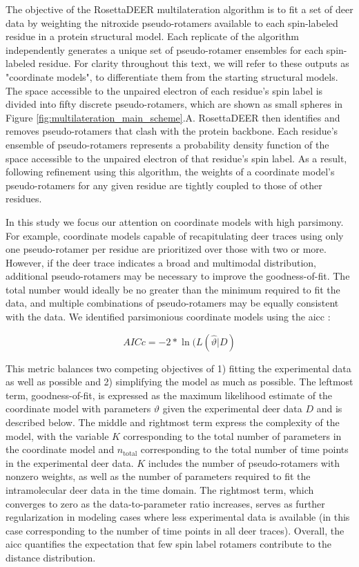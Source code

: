 The objective of the RosettaDEER multilateration algorithm is to fit a set of \gls{deer} data by weighting the nitroxide pseudo-rotamers available to each spin-labeled residue in a protein structural model. Each replicate of the algorithm independently generates a unique set of pseudo-rotamer ensembles for each spin-labeled residue. For clarity throughout this text, we will refer to these outputs as "coordinate models", to differentiate them from the starting structural models. The space accessible to the unpaired electron of each residue’s spin label is divided into fifty discrete pseudo-rotamers, which are shown as small spheres in Figure \ref{fig:multilateration_main_scheme}.A. RosettaDEER then identifies and removes pseudo-rotamers that clash with the protein backbone. Each residue’s ensemble of pseudo-rotamers represents a probability density function of the space accessible to the unpaired electron of that residue’s spin label. As a result, following refinement using this algorithm, the weights of a coordinate model’s pseudo-rotamers for any given residue are tightly coupled to those of other residues.



In this study we focus our attention on coordinate models with high parsimony. For example, coordinate models capable of recapitulating \gls{deer} traces using only one pseudo-rotamer per residue are prioritized over those with two or more. However, if the \gls{deer} trace indicates a broad and multimodal distribution, additional pseudo-rotamers may be necessary to improve the goodness-of-fit. The total number would ideally be no greater than the minimum required to fit the data, and multiple combinations of pseudo-rotamers may be equally consistent with the data. We identified parsimonious coordinate models using the \gls{aicc} \citep*{Akaike1973, Burnham2002, Sugiura1978}:

\begin{equation}
AICc = -2 * \ln(L(\hat{\vartheta}|D)
\label{eq:aicc}
\end{equation}

This metric balances two competing objectives of 1) fitting the experimental data as well as possible and 2) simplifying the model as much as possible. The leftmost term, goodness-of-fit, is expressed as the maximum likelihood estimate of the coordinate model with parameters $\vartheta$ given the experimental \gls{deer} data $D$ and is described below. The middle and rightmost term express the complexity of the model, with the variable $K$ corresponding to the total number of parameters in the coordinate model and $n_{\mathup{total}}$ corresponding to the total number of time points in the experimental \gls{deer} data. $K$ includes the number of pseudo-rotamers with nonzero weights, as well as the number of parameters required to fit the intramolecular \gls{deer} data in the time domain. The rightmost term, which converges to zero as the data-to-parameter ratio increases, serves as further regularization in modeling cases where less experimental data is available (in this case corresponding to the number of time points in all \gls{deer} traces). Overall, the \gls{aicc} quantifies the expectation that few spin label rotamers contribute to the distance distribution.

